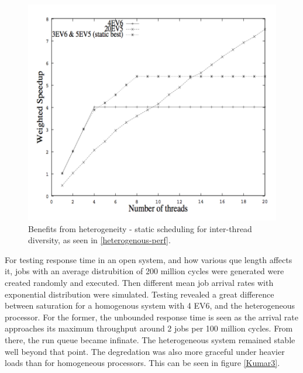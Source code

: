 \begin{figure}[htb]
    \centering
    \includegraphics[width=1.0\textwidth]{Figures/Heterogeneous/Kumar2}
    \caption{Benefits from heterogeneity - static scheduling for inter-thread diversity, as seen in \ref{heterogenous-perf}.}
    \label{fig:Kumar2}
\end{figure}

For testing response time in an open system, and how various que length affects it, jobs with an average distrubition of 200 million cycles were generated were created randomly and executed.
Then different mean job arrival rates with exponential distribution were simulated.
Testing revealed a great difference between saturation for a homogenous system with 4 EV6, and the heterogeneous processor.
For the former, the unbounded response time is seen as the arrival rate approaches its maximum throughput around 2 jobs per 100 million cycles.
From there, the run queue became infinate.
The heterogeneous system remained stable well beyond that point.
The degredation was also more graceful under heavier loads than for homogeneous processors.
This can be seen in figure \ref{Kumar3}.

